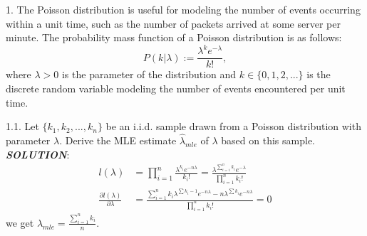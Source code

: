 \documentclass{article}
\theoremstyle{definition}
\theoremstyle{definition}
\theoremstyle{remark}
\begin{document}
1. The Poisson distribution is useful for modeling the number of events occurring within a unit time, such
as the number of packets arrived at some server per minute. The probability mass function of a Poisson
distribution is as follows:
\[
P(k|\lambda):= \frac{\lambda^k e^{-\lambda}}{k!},
\]
where $\lambda > 0$ is the parameter of the distribution and $k\in\{0,1,2,...\}$ is the discrete random variable modeling
the number of events encountered per unit time.

1.1. Let $\{k_1,k_2,...,k_n\}$ be an i.i.d. sample drawn from a Poisson distribution with parameter $\lambda$. Derive the MLE estimate $\hat{\lambda}_{mle}$
of $\lambda$ based on this sample.\\
\emph{\textbf{SOLUTION}}:\\
\begin{equation}\nonumber
\begin{aligned}
l(\lambda)&=\prod\limits_{i=1}^{n}\frac{\lambda^{k_i} e^{-n\lambda}}{k_i!}=\frac{\lambda^{\sum\limits_{i=1}^n k_i} e^{-\lambda}}{\prod\limits_{i=1}^{n}k_i!}\\
\frac{\partial l(\lambda)}{\partial \lambda}&=\frac{\sum\limits_{i=1}^n k_i\lambda^{\sum k_i - 1} e^{-n\lambda}-n\lambda^{\sum k_i} e^{-n\lambda}}{\prod\limits_{i=1}^{n}k_i!}=0
\end{aligned}
\end{equation}
we get $\hat{\lambda}_{mle} = \frac{\sum\limits_{i=1}^n k_i}{n}$.
\end{document}
